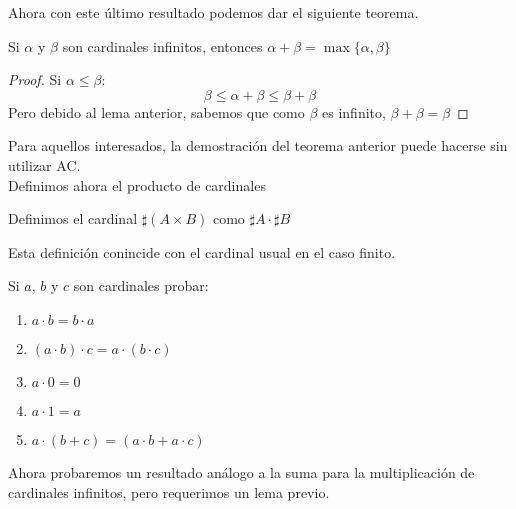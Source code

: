 \documentclass[12pt,a4paper]{book}
\begin{document}
Ahora con este último resultado podemos dar el siguiente teorema.
\begin{teo}
Si $\alpha$ y $\beta$ son cardinales infinitos, entonces $ \alpha + \beta = \max \{ \alpha , \beta \}$
\begin{proof}
Si $\alpha \leq \beta$:
$$\beta \leq \alpha + \beta \leq \beta + \beta$$
Pero debido al lema anterior, sabemos que como $\beta$ es infinito, $\beta + \beta = \beta$
\end{proof}
\end{teo}
Para aquellos interesados, la demostración del teorema anterior puede hacerse sin utilizar AC. \\[0.5cm]
Definimos ahora el producto de cardinales
\begin{defi}
Definimos el cardinal  $\sharp (A \times B)$ como $\sharp A \cdot \sharp B$
\end{defi}
Esta definición conincide con el cardinal usual en el caso finito.
\begin{ej}
Si $a$, $b$ y $c$ son cardinales probar:
\begin{enumerate}
\item $ a \cdot b = b \cdot a$
\item $(a \cdot b) \cdot c = a \cdot (b \cdot c)$
\item $ a \cdot 0 = 0$
\item $a \cdot 1 = a$
\item $a \cdot (b + c) = (a \cdot b + a \cdot c)$
\end{enumerate}
\end{ej}
Ahora probaremos un resultado análogo a la suma para la multiplicación de cardinales infinitos, pero requerimos un lema previo.
\end{document}
